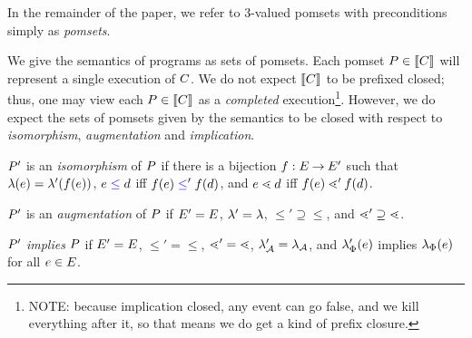 In the remainder of the paper, we refer to 3-valued pomsets with
preconditions simply as \emph{pomsets}.

We give the semantics of programs as sets of pomsets.  Each pomset
$P\in\llbracket C\rrbracket$ will represent a single execution of $C$.  We do not
expect $\llbracket C\rrbracket$ to be prefixed closed; thus, one may view each
$P\in\llbracket C\rrbracket$ as a \emph{completed} execution\footnote{NOTE: because
  implication closed, any event can go false, and we kill everything after
  it, so that means we do get a kind of prefix closure.}.  However, we do
expect the sets of pomsets given by the semantics to be closed with respect
to \emph{isomorphism}, \emph{augmentation} and \emph{implication}.
\begin{definition}
  $P'$ is an \emph{isomorphism} of $P$ if there is a bijection
  $f:E\mathbin\rightarrow E'$ such that $\lambda(e)=\lambda'(f(e))$,
  $e\mathrel{{\color{blue}\leq}}d$ iff $f(e)\mathrel{{\color{blue}\leq}}'f(d)$, and $e\lessdot d$ iff
  $f(e)\lessdot'f(d)$.

  $P'$ is an \emph{augmentation} of $P$ if $E'=E$,
  ${\lambda'}={\lambda}$, ${\le'}\supseteq{\le}$, and
  ${\lessdot'}\supseteq{\lessdot}$.

  $P'$ \emph{implies} $P$ if $E'=E$, ${\le'}={\le}$,
  ${\lessdot'}={\lessdot}$, $\lambda_{\mathcal{A}}'=\lambda_{\mathcal{A}}$, and $\lambda_{\Phi}'(e)$
  implies $\lambda_{\Phi}(e)$ for all $e\in E$.
\end{definition}




